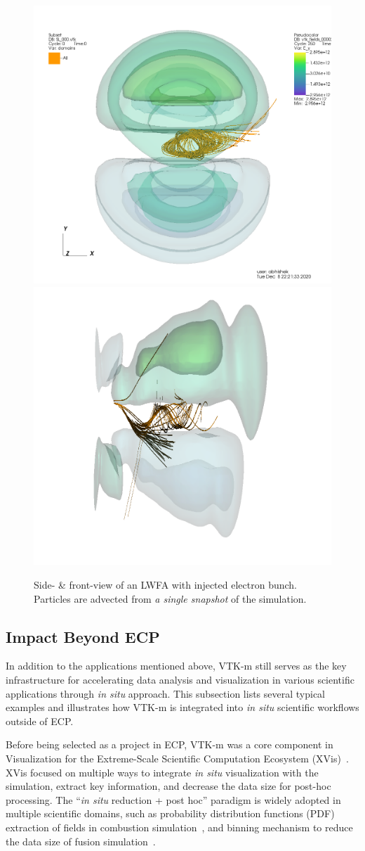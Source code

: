 \begin{figure}[ht]
  \centering
  \includegraphics[width=0.49\linewidth]{figures/lwfa_particle_advection_front.png}%
  \includegraphics[width=0.49\linewidth]{figures/lwfa_particle_advection_side.png}
  \caption{Side- \& front-view of an LWFA with injected electron bunch.
  Particles are advected from \emph{a single snapshot} of the simulation.}
  \label{fig:lwfa_particle_advection}
\end{figure}

\subsection{Impact Beyond ECP}


In addition to the applications mentioned above, VTK-m still serves as the key infrastructure for accelerating data analysis and visualization in various scientific applications through \emph{in situ} approach. This subsection lists several typical examples and illustrates how VTK-m is integrated into \emph{in situ} scientific workflows outside of ECP.


Before being selected as a project in ECP, VTK-m was a core component in Visualization for the Extreme-Scale Scientific Computation Ecosystem (XVis)~\cite{Moreland2019}. 
XVis focused on multiple ways to integrate \emph{in situ} visualization with the simulation, extract key information, and decrease the data size for post-hoc processing.
The ``\emph{in situ} reduction + post hoc'' paradigm is widely adopted in multiple scientific domains, such as probability distribution functions (PDF) extraction of fields in combustion simulation~\cite{7874311}, and binning mechanism to reduce the data size of fusion simulation~\cite{Kress2018}. 


